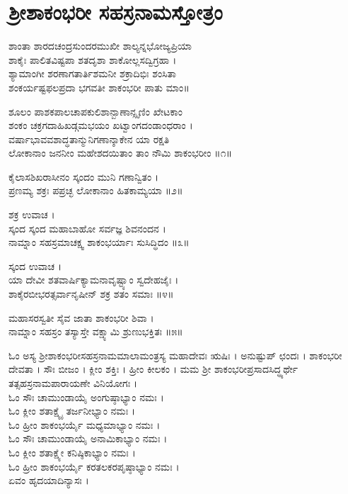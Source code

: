 \section{ಶ್ರೀಶಾಕಂಭರೀ ಸಹಸ್ರನಾಮಸ್ತೋತ್ರಂ}


ಶಾಂತಾ ಶಾರದಚಂದ್ರಸುಂದರಮುಖೀ ಶಾಲ್ಯನ್ನಭೋಜ್ಯಪ್ರಿಯಾ\\
ಶಾಕೈಃ ಪಾಲಿತವಿಷ್ಟಪಾ ಶತದೃಶಾ ಶಾಕೋಲ್ಲಸದ್ವಿಗ್ರಹಾ ।\\
ಶ್ಯಾಮಾಂಗೀ ಶರಣಾಗತಾರ್ತಿಶಮನೀ ಶಕ್ರಾದಿಭಿಃ ಶಂಸಿತಾ\\
ಶಂಕರ್ಯಷ್ಟಫಲಪ್ರದಾ ಭಗವತೀ ಶಾಕಂಭರೀ ಪಾತು ಮಾಂ॥

ಶೂಲಂ ಪಾಶಕಪಾಲಚಾಪಕುಲಿಶಾನ್ಬಾಣಾನ್ಸೃಣಿಂ ಖೇಟಕಾಂ\\
ಶಂಕಂ ಚಕ್ರಗದಾಹಿಖಡ್ಗಮಭಯಂ ಖಟ್ವಾಂಗದಂಡಾಂಧರಾಂ ।\\
ವರ್ಷಾಭಾವವಶಾದ್ಧತಾನ್ಮುನಿಗಣಾನ್ಶಾಕೇನ ಯಾ ರಕ್ಷತಿ\\
ಲೋಕಾನಾಂ ಜನನೀಂ ಮಹೇಶದಯಿತಾಂ ತಾಂ ನೌಮಿ ಶಾಕಂಭರೀಂ ॥೧॥

ಕೈಲಾಸಶಿಖರಾಸೀನಂ ಸ್ಕಂದಂ ಮುನಿ ಗಣಾನ್ವಿತಂ ।\\
ಪ್ರಣಮ್ಯ ಶಕ್ರಃ ಪಪ್ರಚ್ಛ ಲೋಕಾನಾಂ ಹಿತಕಾಮ್ಯಯಾ ॥೨॥

ಶಕ್ರ ಉವಾಚ ।\\
ಸ್ಕಂದ ಸ್ಕಂದ ಮಹಾಬಾಹೋ ಸರ್ವಜ್ಞ ಶಿವನಂದನ ।\\
ನಾಮ್ನಾಂ ಸಹಸ್ರಮಾಚಕ್ಷ್ವ ಶಾಕಂಭರ್ಯಾಃ ಸುಸಿದ್ಧಿದಂ ॥೩॥

ಸ್ಕಂದ ಉವಾಚ ।\\
ಯಾ ದೇವೀ ಶತವಾರ್ಷಿಕ್ಯಾಮನಾವೃಷ್ಟ್ಯಾಂ ಸ್ವದೇಹಜೈಃ ।\\
ಶಾಕೈರಬೀಭರತ್ಸರ್ವಾನೃಷೀನ್ ಶಕ್ರ ಶತಂ ಸಮಾಃ ॥೪॥

ಮಹಾಸರಸ್ವತೀ ಸೈವ ಜಾತಾ ಶಾಕಂಭರೀ ಶಿವಾ ।\\
ನಾಮ್ನಾಂ ಸಹಸ್ರಂ ತಸ್ಯಾಸ್ತೇ ವಕ್ಷ್ಯಾಮಿ ಶ್ರುಣುಭಕ್ತಿತಃ ॥೫॥

ಓಂ ಅಸ್ಯ ಶ್ರೀಶಾಕಂಭರೀಸಹಸ್ರನಾಮಮಾಲಾಮಂತ್ರಸ್ಯ ಮಹಾದೇವಃ ಋಷಿಃ । ಅನುಷ್ಟುಪ್ ಛಂದಃ । ಶಾಕಂಭರೀ ದೇವತಾ । ಸೌಃ ಬೀಜಂ । ಕ್ಲೀಂ ಶಕ್ತಿಃ । ಹ್ರೀಂ ಕೀಲಕಂ । ಮಮ ಶ್ರೀ ಶಾಕಂಭರೀಪ್ರಸಾದಸಿದ್ಧ್ಯರ್ಥೇ ತತ್ಸಹಸ್ರನಾಮಪಾರಾಯಣೇ ವಿನಿಯೋಗಃ ।\\

ಓಂ ಸೌಃ ಚಾಮುಂಡಾಯೈ ಅಂಗುಷ್ಠಾಭ್ಯಾಂ ನಮಃ ।\\
ಓಂ ಕ್ಲೀಂ ಶತಾಕ್ಷ್ಯೈ ತರ್ಜನೀಭ್ಯಾಂ ನಮಃ ।\\
ಓಂ ಹ್ರೀಂ ಶಾಕಂಭರ್ಯೈ ಮಧ್ಯಮಾಭ್ಯಾಂ ನಮಃ ।\\
ಓಂ ಸೌಃ ಚಾಮುಂಡಾಯೈ ಅನಾಮಿಕಾಭ್ಯಾಂ ನಮಃ ।\\
ಓಂ ಕ್ಲೀಂ ಶತಾಕ್ಷ್ಯೇ ಕನಿಷ್ಠಿಕಾಭ್ಯಾಂ ನಮಃ ।\\
ಓಂ ಹ್ರೀಂ ಶಾಕಂಭರ್ಯೈ ಕರತಲಕರಪೃಷ್ಠಾಭ್ಯಾಂ ನಮಃ ।\\
ಏವಂ ಹೃದಯಾದಿನ್ಯಾಸಃ ।\\



